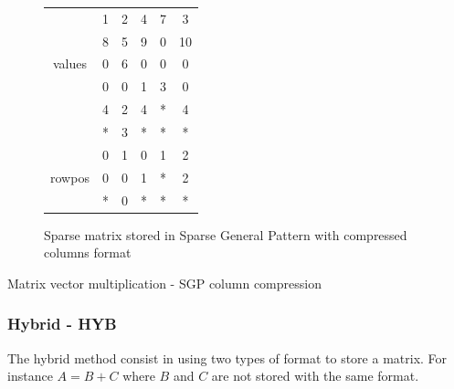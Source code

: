 \begin{figure}[h]
\centering
\begin{tabular}{c|ccccc|}
	\cline{2-6}
	 \multirow{5}{*}{values}  & 1 & 2 & 4 & 7 & 3  \\
	                          & 8 & 5 & 9 & 0 & 10 \\
	                          & 0 & 6 & 0 & 0 & 0  \\ \cline{2-6}
	\multirow{5}{*}{rowindex} & 0 & 0 & 1 & 3 & 0  \\
	                          & 4 & 2 & 4 & * & 4  \\
	                          & * & 3 & * & * & *  \\ \cline{2-6}
	 \multirow{5}{*}{rowpos}  & 0 & 1 & 0 & 1 & 2  \\
	                          & 0 & 0 & 1 & * & 2  \\
	                          & * & 0 & * & * & *  \\ \cline{2-6}
\end{tabular}
\caption{Sparse matrix stored in Sparse General Pattern with compressed columns format \label{fig:methods:sgpc_ex}}
\end{figure}


\begin{algorithm}[h]
	\DontPrintSemicolon
	\caption{Matrix vector multiplication - SGP column compression\label{fig:methods:sgpc_algo}}
\end{algorithm}

\subsubsection{Hybrid - HYB}

The hybrid method consist in using two types of format to store a matrix.
For instance $A = B + C$ where $B$ and $C$ are not stored with the same format.


